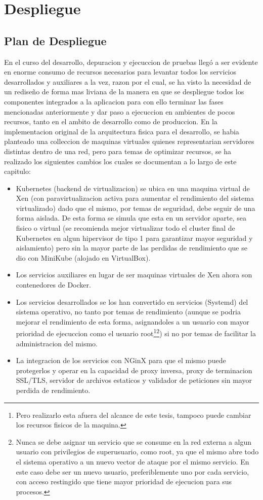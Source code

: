 
\chapter{Despliegue}
\label{capitulo6}

\section{Plan de Despliegue}
En el curso del desarrollo, depuracion y ejecuccion de pruebas llegó a ser evidente en enorme consumo de recursos necesarios para levantar todos los servicios desarrollados y auxiliares a la vez, razon por el cual, se ha visto la necesidad de un rediseño de forma mas liviana de la manera en que se despliegue todos los componentes integrados a la aplicacion para con ello terminar las fases mencionadas anteriormente y dar paso a ejecuccion en ambientes de pocos recursos, tanto en el ambito de desarrollo como de produccion. En la implementacion original de la arquitectura fisica para el desarrollo, se habia planteado una colleccion de maquinas virtuales quienes representarian servidores distintas dentro de una red, pero para temas de optimizar recursos, se ha realizado los siguientes cambios los cuales se documentan a lo largo de este capitulo:
\begin{itemize}
	\item Kubernetes (backend de virtualizacion) se ubica en una maquina virtual de Xen (con paravirtualizacion activa para aumentar el rendimiento del sistema virtualizado) dado que el mismo, por temas de seguridad, debe seguir de una forma aislada. De esta forma se simula que esta en un servidor aparte, sea fisico o virtual (se recomienda mejor virtualizar todo el cluster final de Kubernetes en algun hipervisor de tipo 1 para garantizar mayor seguridad y aislamiento) pero sin la mayor parte de las perdidas de rendimiento que se dio con MiniKube (alojado en VirtualBox).
    \item Los servicios auxiliares en lugar de ser maquinas virtuales de Xen ahora son contenedores de Docker.
    \item Los servicios desarrollados se los han convertido en servicios (Systemd) del sistema operativo, no tanto por temas de rendimiento (aunque se podria mejorar el rendimiento de esta forma, asignandoles a un usuario con mayor prioridad de ejecuccion como el usuario root\footnote{Pero realizarlo esta afuera del alcance de este tesis, tampoco puede cambiar los recursos fisicos de la maquina.}\footnote{Nunca se debe asignar un servicio que se consume en la red externa a algun usuario con privilegios de superusuario, como root, ya que el mismo abre todo el sistema operativo a un nuevo vector de ataque por el mismo servicio. En este caso debe ser un nuevo usuario, preferiblemente uno por cada servicio, con acceso restingido que tiene mayor prioridad de ejecucion para sus procesos.}) si no por temas de facilitar la administracion del mismo.
    \item La integracion de los servicios con NGinX para que el mismo puede protegerlos y operar en la capacidad de proxy inversa, proxy de terminacion SSL/TLS, servidor de archivos estaticos y validador de peticiones sin mayor perdida de rendimiento.
\end{itemize}
